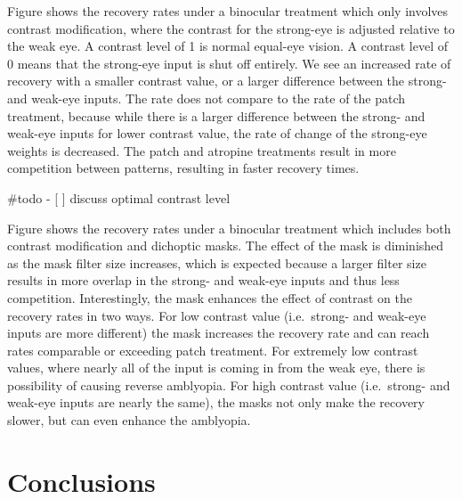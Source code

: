 \documentclass[
  letterpaper,
  number]{elsarticle}
\begin{document}
Figure \citep{fig:dODI_constrast} shows the recovery rates under a
binocular treatment which only involves contrast modification, where the
contrast for the strong-eye is adjusted relative to the weak eye. A
contrast level of 1 is normal equal-eye vision. A contrast level of 0
means that the strong-eye input is shut off entirely. We see an
increased rate of recovery with a smaller contrast value, or a larger
difference between the strong- and weak-eye inputs. The rate does not
compare to the rate of the patch treatment, because while there is a
larger difference between the strong- and weak-eye inputs for lower
contrast value, the rate of change of the strong-eye weights is
decreased. The patch and atropine treatments result in more competition
between patterns, resulting in faster recovery times.

\#todo - {[} {]} discuss optimal contrast level

Figure \citep{fig:dODI_constrast_mask} shows the recovery rates under a
binocular treatment which includes both contrast modification and
dichoptic masks. The effect of the mask is diminished as the mask filter
size increases, which is expected because a larger filter size results
in more overlap in the strong- and weak-eye inputs and thus less
competition. Interestingly, the mask enhances the effect of contrast on
the recovery rates in two ways. For low contrast value (i.e.~strong- and
weak-eye inputs are more different) the mask increases the recovery rate
and can reach rates comparable or exceeding patch treatment. For
extremely low contrast values, where nearly all of the input is coming
in from the weak eye, there is possibility of causing reverse amblyopia.
For high contrast value (i.e.~strong- and weak-eye inputs are nearly the
same), the masks not only make the recovery slower, but can even enhance
the amblyopia.

\hypertarget{section}{%
\chapter{}\label{section}}

\hypertarget{section-1}{%
\chapter{}\label{section-1}}

\part{Conclusions}
\end{document}
